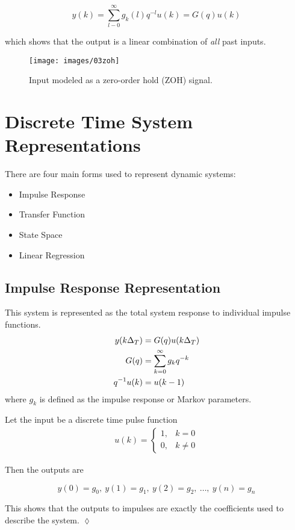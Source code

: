 \begin{equation*}
y(k) = \sum_{l-0}^\infty g_k(l)q^{-l}u(k) = G(q)u(k)
\end{equation*}

which shows that the output is a linear combination of \textit{all} past inputs.
\begin{figure}[ht!]
\centering
\texttt{[image: images/03zoh]}
\caption{Input modeled as a zero-order hold (ZOH) signal.}%
\label{fig:03zoh}
\end{figure}

\section{Discrete Time System Representations}
There are four main forms used to represent dynamic systems:
\begin{itemize}
\item Impulse Response
\item Transfer Function
\item State Space
\item Linear Regression
\end{itemize}

\subsection{Impulse Response Representation}
This system is represented as the total system response to individual impulse functions.
\begin{align*}
y(k\Delta_T) &= G(q)u(k\Delta_T) \\
G(q) &= \sum_{k=0}^\infty g_k q^{-k} \\
q^{-1}u(k) &= u(k-1)
\end{align*}
where $g_k$ is defined as the impulse response or Markov parameters.

\begin{example}
Let the input be a discrete time pulse function
\begin{align}
\label{eq:03impulse}
u(k) = \begin{cases} 1, & k=0 \\ 0, & k\neq 0 \end{cases}
\end{align}

Then the outputs are

\begin{equation*}
y(0)=g_0,~y(1)=g_1,~y(2)=g_2,~\ldots,~y(n)=g_n
\end{equation*}

This shows that the outputs to impulses are exactly the coefficients used to describe the system.
$\lozenge$
\end{example}

